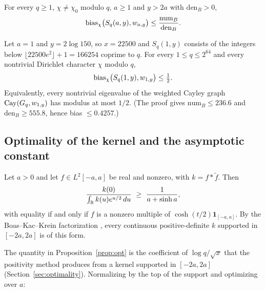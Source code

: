 \begin{theorem}\label{thm:closed}
For every $q\ge1$, $\chi\ne\chi_0$ modulo $q$, $a\ge1$ and $y>2a$ with $\mathrm{den}_B>0$,
\[
  \operatorname{bias}_\chi\bigl(S_q(a,y),w_{a,y}\bigr)\le\frac{\mathrm{num}_B}{\mathrm{den}_B}.
\]
\end{theorem}

\begin{corollary}\label{cor:cert}
Let $a=1$ and $y=2\log150$, so $x=22500$ and $S_q(1,y)$ consists of the integers below
$\lfloor22500e^2\rfloor+1=166254$ coprime to $q$. For every $1\le q\le2^{64}$ and every nontrivial
Dirichlet character $\chi$ modulo $q$,
\[
  \operatorname{bias}_\chi\bigl(S_q(1,y),w_{1,y}\bigr)\le\tfrac12 .
\]
Equivalently, every nontrivial eigenvalue of the weighted Cayley graph $\mathrm{Cay}(G_q,w_{1,y})$ has modulus
at most $1/2$. (The proof gives $\mathrm{num}_B\le236.6$ and $\mathrm{den}_B\ge555.8$, hence bias $\le0.4257$.)
\end{corollary}

\subsection{Optimality of the kernel and the asymptotic constant}

\begin{proposition}\label{prop:opt}
Let $a>0$ and let $f\in L^2[-a,a]$ be real and nonzero, with $k=f*\tilde f$. Then
\[
  \frac{k(0)}{\int_\R k(u)e^{u/2}\,du}\ \ge\ \frac1{a+\sinh a},
\]
with equality if and only if $f$ is a nonzero multiple of $\cosh(t/2)\mathbf 1_{[-a,a]}$. By the
Boas--Kac--Krein factorization \cite{boaskac1945,ehmgneitingrichards2004}, every continuous positive-definite
$k$ supported in $[-2a,2a]$ is of this form.
\end{proposition}

The quantity in Proposition~\ref{prop:opt} is the coefficient of $\log q/\sqrt x$ that the positivity method
produces from a kernel supported in $[-2a,2a]$ (Section~\ref{sec:optimality}). Normalizing by the top of the
support and optimizing over $a$:

